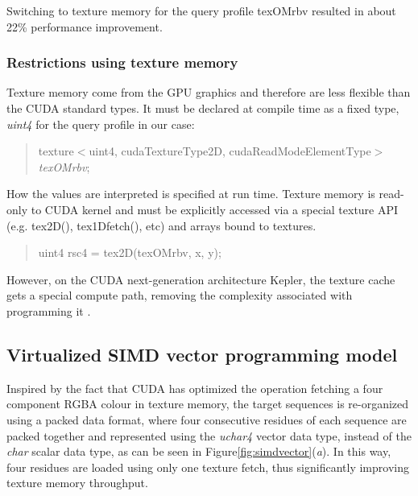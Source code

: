 Switching to texture memory for the query profile texOMrbv resulted in about 22\% performance improvement.

\subsubsection*{Restrictions using texture memory}

Texture memory come from the GPU graphics and therefore are less flexible than the CUDA standard types. It must be declared at compile time as a fixed type, \emph{uint4} for the query profile in our case:

\begin{quote}
\selectfont
 texture$<$uint4, cudaTextureType2D, cudaReadModeElementType$>$ \emph{texOMrbv};
\end{quote}

How the values are interpreted is specified at run time. Texture memory is read-only to CUDA kernel and must be explicitly accessed via a special texture API (e.g. tex2D(), tex1Dfetch(), etc) and arrays bound to textures.

\begin{quote}
\selectfont
 uint4 rsc4 = tex2D(texOMrbv, x, y);
\end{quote}

However, on the CUDA next-generation architecture Kepler, the texture cache gets a special compute path, removing the complexity associated with programming it \citep{Kepler}.

\subsection{Virtualized SIMD vector programming model}

Inspired by the fact that CUDA has optimized the operation fetching a four component RGBA colour in texture memory, the target sequences is re-organized using a packed data format, where four consecutive residues of each sequence are packed together and represented using the \emph{uchar4} vector data type, instead of the \emph{char} scalar data type, as can be seen in Figure\ref{fig:simdvector}(\textit{a}). In this way, four residues are loaded using only one texture fetch, thus significantly improving texture memory throughput. 


